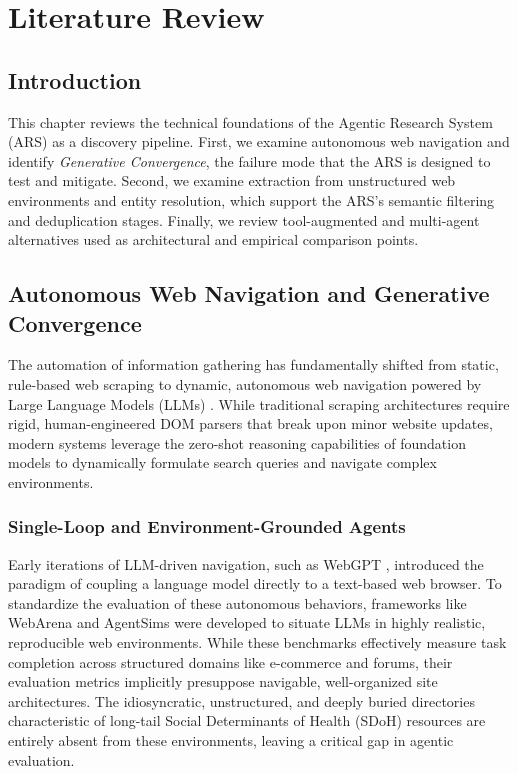\documentclass[12pt,oneside]{report}
\begin{document}
\chapter{Literature Review}

\section{Introduction}
This chapter reviews the technical foundations of the Agentic Research System (ARS) as a discovery pipeline. First, we examine autonomous web navigation and identify \textit{Generative Convergence}, the failure mode that the ARS is designed to test and mitigate. Second, we examine extraction from unstructured web environments and entity resolution, which support the ARS's semantic filtering and deduplication stages. Finally, we review tool-augmented and multi-agent alternatives used as architectural and empirical comparison points.

\section{Autonomous Web Navigation and Generative Convergence}
The automation of information gathering has fundamentally shifted from static, rule-based web scraping \cite{1, 2} to dynamic, autonomous web navigation powered by Large Language Models (LLMs) \cite{3, 4, 5}. While traditional scraping architectures require rigid, human-engineered DOM parsers that break upon minor website updates, modern systems leverage the zero-shot reasoning capabilities of foundation models \cite{6, 7} to dynamically formulate search queries and navigate complex environments. 

\subsection{Single-Loop and Environment-Grounded Agents}
Early iterations of LLM-driven navigation, such as WebGPT \cite{10}, introduced the paradigm of coupling a language model directly to a text-based web browser. To standardize the evaluation of these autonomous behaviors, frameworks like WebArena \cite{11} and AgentSims \cite{12} were developed to situate LLMs in highly realistic, reproducible web environments. While these benchmarks effectively measure task completion across structured domains like e-commerce and forums, their evaluation metrics implicitly presuppose navigable, well-organized site architectures. The idiosyncratic, unstructured, and deeply buried directories characteristic of long-tail Social Determinants of Health (SDoH) resources are entirely absent from these environments, leaving a critical gap in agentic evaluation.
\end{document}

